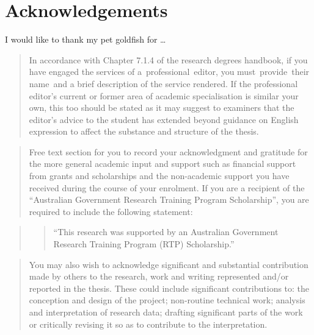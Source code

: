 \documentclass{uniexeterthesis}
\begin{document}

\hypertarget{acknowledgements}{%
\chapter*{Acknowledgements}\label{acknowledgements}}


I would like to thank my pet goldfish for \ldots{}

\begin{quote}
In accordance with Chapter 7.1.4 of the research degrees handbook, if
you have engaged the services of a~professional~editor, you
must~provide~their name~and a brief description of the service rendered.
If the professional editor's current or former area of academic
specialisation is similar your own, this too should be stated as it may
suggest to examiners that the editor's advice to the student has
extended beyond guidance on English expression to affect the substance
and structure of the thesis.
\end{quote}

\begin{quote}
Free text section for you to record your acknowledgment and gratitude
for the more general academic input and support such as financial
support from grants and scholarships and the non-academic support you
have received during the course of your enrolment. If you are a
recipient of the ``Australian Government Research Training Program
Scholarship'', you are required to include the following statement:
\end{quote}

\begin{quote}
\begin{quote}
``This research was supported by an Australian Government Research
Training Program (RTP) Scholarship.''
\end{quote}
\end{quote}

\begin{quote}
You may also wish to acknowledge significant and substantial
contribution made by others to the research, work and writing
represented and/or reported in the thesis. These could include
significant contributions to: the conception and design of the project;
non-routine technical work; analysis and interpretation of research
data; drafting significant parts of the work or critically revising it
so as to contribute to the interpretation.
\end{quote}
\end{document}
